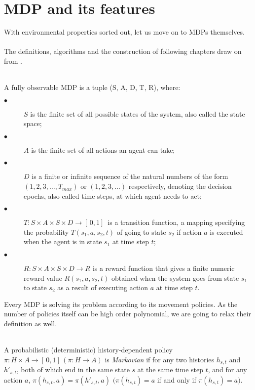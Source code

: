 \section{MDP and its features}
With environmental properties sorted out, let us move on to MDPs themselves. 
\\ 
\\
The definitions, algorithms and the construction of following chapters draw on from \cite{Kolobov2012}. 
  \\ \\

\begin{definition}\label{def:MDP}
A fully observable MDP is a tuple (S, A, D, T, R), where:
\begin{description}
  \item[$\bullet$ ] $S$ is the finite set of all possible states of the system, also called the state space;
  \item[$\bullet$ ] $A$ is the finite set of all actions an agent can take;
  \item[$\bullet$ ] $D$ is a finite or infinite sequence of the natural numbers of the form $(1, 2, 3, \ldots, T_{max})$ or $(1, 2, 3, \ldots)$ respectively, 
        denoting the decision epochs, also called time steps, at which agent needs to act;
  \item[$\bullet$ ] $T : S \times A \times S \times D \rightarrow [ \,0, 1] \,$ is a transition function, a mapping specifying the probability $T(s_1, a, s_2, t)$ of going to state $s_2$ if action $a$ is executed when the agent is in state $s_1$ at time step $t$;
  \item[$\bullet$ ] $R : S \times A \times S \times D \rightarrow R$ is a reward function that gives a finite numeric reward value $R(s_1, a, s_2, t)$ obtained when the system goes from state $s_1$ to state $s_2$ as a result of executing action $a$ at time step $t$.
\end{description}

\end{definition}

Every MDP is solving its problem according to its movement policies. As the number of policies itself can be high order polynomial, we are going to relax their definition as well.
\\ \\
\begin{definition}
A probabilistic (deterministic) history-dependent policy $\pi: H \times A \rightarrow [ \,0, 1] \,(\pi: H \rightarrow A)$ is \textit{Markovian} if for any two histories $h_{s,t}$ and $h'_{s,t}$, both of which end in the same state $s$ at the same time step $t$, and for any action $a$, 
$\pi(h_{s,t}, a) = \pi(h'_{s,t}, a)$ $(\pi(h_{s,t}) = a$ if and only if $\pi(h_{s,t}) = a)$.
\end{definition}

